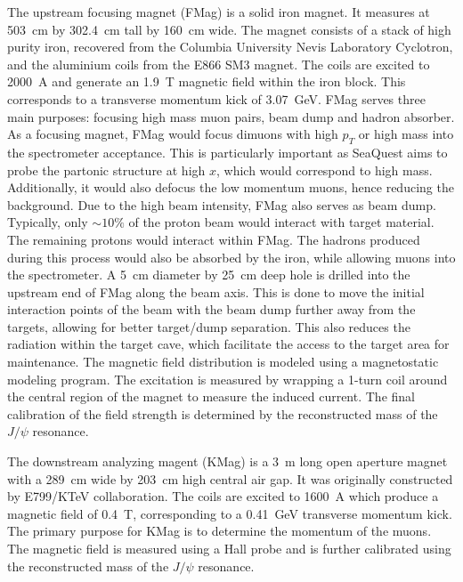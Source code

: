 \documentclass[../main.tex]{subfiles}
\begin{document}
The upstream focusing magnet (FMag) is a solid iron magnet. It measures at \SI{503}{\cm}
by \SI{302.4}{\cm} tall by \SI{160}{\cm} wide.
The magnet consists of a stack of high purity iron, recovered from
the Columbia University Nevis Laboratory Cyclotron, and the aluminium coils from the E866
SM3 magnet. The coils are excited to \SI{2000}{\ampere} and generate an \SI{1.9}{\tesla}
magnetic field within the iron block. This corresponds to a transverse momentum kick of
\SI{3.07}{\GeV}. FMag serves three main purposes: focusing high mass muon pairs, beam
dump and hadron absorber. As a focusing magnet, FMag would focus dimuons with high $p_T$
or high mass into the spectrometer acceptance. This is particularly important as SeaQuest
aims to probe the partonic structure at high $x$, which would correspond to high mass.
Additionally, it would also defocus the low momentum muons, hence reducing the background.
Due to the high beam intensity, FMag also serves as beam dump. Typically, only $\sim 10\%$
of the proton beam would interact with target material. The remaining protons would interact
within FMag. The hadrons produced during this process would also be absorbed by the iron,
while allowing muons into the spectrometer.
A \SI{5}{\cm} diameter by \SI{25}{\cm} deep hole is drilled into the upstream
end of FMag along the beam axis. This is done to move the initial interaction points
of the beam with the beam dump further away from the targets, allowing for better target/dump
separation. This also reduces the radiation within the target cave, which facilitate the
access to the target area for maintenance.
The magnetic field distribution is modeled using a magnetostatic modeling program. The
excitation is measured by wrapping a 1-turn coil around the central region of the magnet to measure the induced
current. The final calibration of the field strength is determined by the reconstructed
mass of the $J/\psi$ resonance.

The downstream analyzing magent (KMag) is a \SI{3}{\meter} long open aperture magnet
with a \SI{289}{\cm} wide by \SI{203}{\cm} high central air gap. It was
originally  constructed by E799/KTeV collaboration.
The coils are excited to \SI{1600}{\ampere} which produce a magnetic field of \SI{0.4}{\tesla},
corresponding to a \SI{0.41}{\GeV} transverse momentum kick. The primary purpose for
KMag is to determine the momentum of the muons. The magnetic field is measured using a Hall
probe and is further calibrated using the reconstructed mass of the $J/\psi$ resonance.
\end{document}
